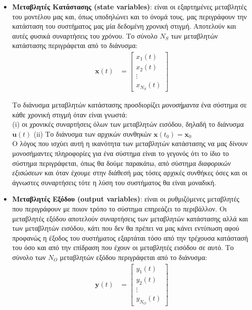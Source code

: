 \documentclass[11pt]{article} %
\numberwithin{equation}{subsection}
\begin{document}
\begin{itemize}
  \item \textbf{Μεταβλητές Κατάστασης (state variables)}: είναι οι εξαρτημένες μεταβλητές του μοντέλου μας και, όπως υποδηλώνει και το όνομά τους, μας περιγράφουν την κατάσταση του συστήματος μας μία δεδομένη χρονική στιγμή. Αποτελούν και αυτές φυσικά συναρτήσεις του χρόνου. Το σύνολο $Ν_{S}$ των μεταβλητών κατάστασης περιγράφεται από το διάνυσμα:
\begin{align*}
\
\textbf{x}(t) &= \begin{bmatrix}
           x_{1}(t) \\
           x_{2}(t) \\
           \vdots \\
           x_{N_{S}}(t)
         \end{bmatrix}
\end{align*}

Το διάνυσμα μεταβλητών κατάστασης προσδιορίζει \textit{μονοσήμαντα} ένα σύστημα σε κάθε χρονική στιγμή όταν είναι γνωστά:\\

(i) οι χρονικές συναρτήσεις όλων των μεταβλητών εισόδου, δηλαδή το διάνυσμα $\textbf{u}(t)$
(ii) Το διάνυσμα των αρχικών συνθηκών $\textbf{x}(t_{0}) = \textbf{x}_{0}$\\

Ο λόγος που ισχύει αυτή η ικανότητα των μεταβλητών κατάστασης να μας δίνουν μονοσήμαντες πληροφορίες για ένα σύστημα είναι το γεγονός ότι το ίδιο το σύστημα περιγράφεται, όπως θα δούμε παρακάτω, από σύστημα \textit{διαφορικών εξισώσεων} και όταν έχουμε στην διάθεσή μας τόσες αρχικές συνθήκες όσες και οι άγνωστες συναρτήσεις τότε η λύση του συστήματος θα είναι μοναδική.

  \item \textbf{Μεταβλητές Εξόδου (output variables)}: είναι οι ρυθμιζόμενες μεταβλητές που περιγράφουν με ποιον τρόπο το σύστημα επηρεάζει το περιβάλλον. Οι μεταβλητές εξόδου αποτελούν συναρτήσεις των μεταβλητών κατάστασης αλλά και των μεταβλητών εισόδου, κάτι που δεν θα πρέπει να μας κάνει εντύπωση αφού προφανώς η έξοδος του συστήματος εξαρτάται τόσο από την τρέχουσα κατάστασή του όσο και από την επίδραση που έχουν οι μεταβλητές εισόδου σε αυτό. Το σύνολο των $Ν_{Ο}$ μεταβλητών εξόδου περιγράφεται από το διάνυσμα:
\begin{align*}
\
\textbf{y}(t) &= \begin{bmatrix}
           y_{1}(t) \\
           y_{2}(t) \\
           \vdots \\
           y_{N_{O}}(t)
         \end{bmatrix}
\end{align*}

\end{itemize}
\end{document}
